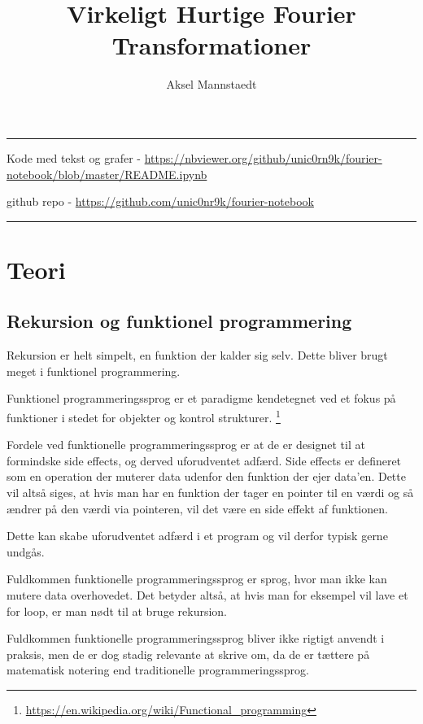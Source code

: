 \documentclass[11pt,a4paper]{article}
\author{Aksel Mannstaedt}
\date{}
\title{Virkeligt Hurtige Fourier Transformationer}
\begin{document}
\maketitle
\noindent\rule{\textwidth}{0.5pt}
\begin{center}
Kode med tekst og grafer - \url{https://nbviewer.org/github/unic0rn9k/fourier-notebook/blob/master/README.ipynb}

github repo - \url{https://github.com/unic0nr9k/fourier-notebook}
\end{center}

\noindent\rule{\textwidth}{0.5pt}

\setcounter{tocdepth}{2}
\tableofcontents
\newpage

\section{Teori}
\label{sec:org1fa6ee1}
\subsection{Rekursion og funktionel programmering}
\label{sec:org80fe491}

Rekursion er helt simpelt, en funktion der kalder sig selv.
Dette bliver brugt meget i funktionel programmering.

Funktionel programmeringssprog er et paradigme kendetegnet ved
et fokus på funktioner i stedet for objekter og kontrol strukturer. \footnote{\url{https://en.wikipedia.org/wiki/Functional\_programming}}

\bigskip

Fordele ved funktionelle programmeringssprog er at de er designet til at formindske side effects,
og derved uforudventet adfærd.
Side effects er defineret som en operation der muterer data udenfor den funktion der ejer data'en.
Dette vil altså siges, at hvis man har en funktion der tager en pointer til en værdi og så ændrer på
den værdi via pointeren, vil det være en side effekt af funktionen.

Dette kan skabe uforudventet adfærd i et program og vil derfor typisk gerne undgås.

Fuldkommen funktionelle programmeringssprog er sprog, hvor man ikke kan mutere data overhovedet.
Det betyder altså, at hvis man for eksempel vil lave et for loop, er man nødt til at bruge rekursion.

Fuldkommen funktionelle programmeringssprog bliver ikke rigtigt anvendt i praksis,
men de er dog stadig relevante at skrive om, da de er tættere på matematisk notering
end traditionelle programmeringssprog.
\end{document}
